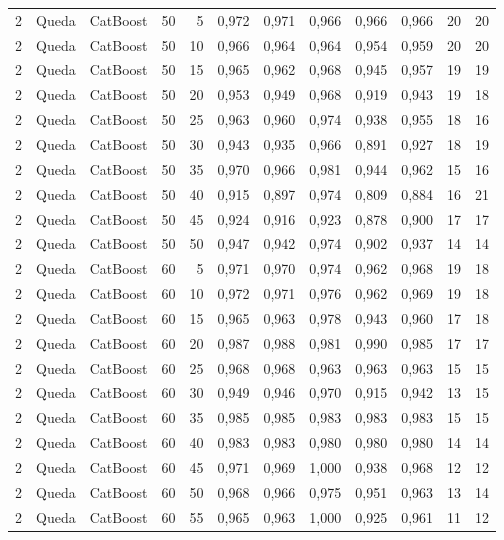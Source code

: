 \begin{longtable}{@{}rllrrrrrrrrr@{}}
2 & Queda & CatBoost & 50 & 5 & 0,972 & 0,971 & 0,966 & 0,966 & 0,966 & 20 & 20 \\
2 & Queda & CatBoost & 50 & 10 & 0,966 & 0,964 & 0,964 & 0,954 & 0,959 & 20 & 20 \\
2 & Queda & CatBoost & 50 & 15 & 0,965 & 0,962 & 0,968 & 0,945 & 0,957 & 19 & 19 \\
2 & Queda & CatBoost & 50 & 20 & 0,953 & 0,949 & 0,968 & 0,919 & 0,943 & 19 & 18 \\
2 & Queda & CatBoost & 50 & 25 & 0,963 & 0,960 & 0,974 & 0,938 & 0,955 & 18 & 16 \\
2 & Queda & CatBoost & 50 & 30 & 0,943 & 0,935 & 0,966 & 0,891 & 0,927 & 18 & 19 \\
2 & Queda & CatBoost & 50 & 35 & 0,970 & 0,966 & 0,981 & 0,944 & 0,962 & 15 & 16 \\
2 & Queda & CatBoost & 50 & 40 & 0,915 & 0,897 & 0,974 & 0,809 & 0,884 & 16 & 21 \\
2 & Queda & CatBoost & 50 & 45 & 0,924 & 0,916 & 0,923 & 0,878 & 0,900 & 17 & 17 \\
2 & Queda & CatBoost & 50 & 50 & 0,947 & 0,942 & 0,974 & 0,902 & 0,937 & 14 & 14 \\
2 & Queda & CatBoost & 60 & 5 & 0,971 & 0,970 & 0,974 & 0,962 & 0,968 & 19 & 18 \\
2 & Queda & CatBoost & 60 & 10 & 0,972 & 0,971 & 0,976 & 0,962 & 0,969 & 19 & 18 \\
2 & Queda & CatBoost & 60 & 15 & 0,965 & 0,963 & 0,978 & 0,943 & 0,960 & 17 & 18 \\
2 & Queda & CatBoost & 60 & 20 & 0,987 & 0,988 & 0,981 & 0,990 & 0,985 & 17 & 17 \\
2 & Queda & CatBoost & 60 & 25 & 0,968 & 0,968 & 0,963 & 0,963 & 0,963 & 15 & 15 \\
2 & Queda & CatBoost & 60 & 30 & 0,949 & 0,946 & 0,970 & 0,915 & 0,942 & 13 & 15 \\
2 & Queda & CatBoost & 60 & 35 & 0,985 & 0,985 & 0,983 & 0,983 & 0,983 & 15 & 15 \\
2 & Queda & CatBoost & 60 & 40 & 0,983 & 0,983 & 0,980 & 0,980 & 0,980 & 14 & 14 \\
2 & Queda & CatBoost & 60 & 45 & 0,971 & 0,969 & 1,000 & 0,938 & 0,968 & 12 & 12 \\
2 & Queda & CatBoost & 60 & 50 & 0,968 & 0,966 & 0,975 & 0,951 & 0,963 & 13 & 14 \\
2 & Queda & CatBoost & 60 & 55 & 0,965 & 0,963 & 1,000 & 0,925 & 0,961 & 11 & 12 \\

\end{longtable}
